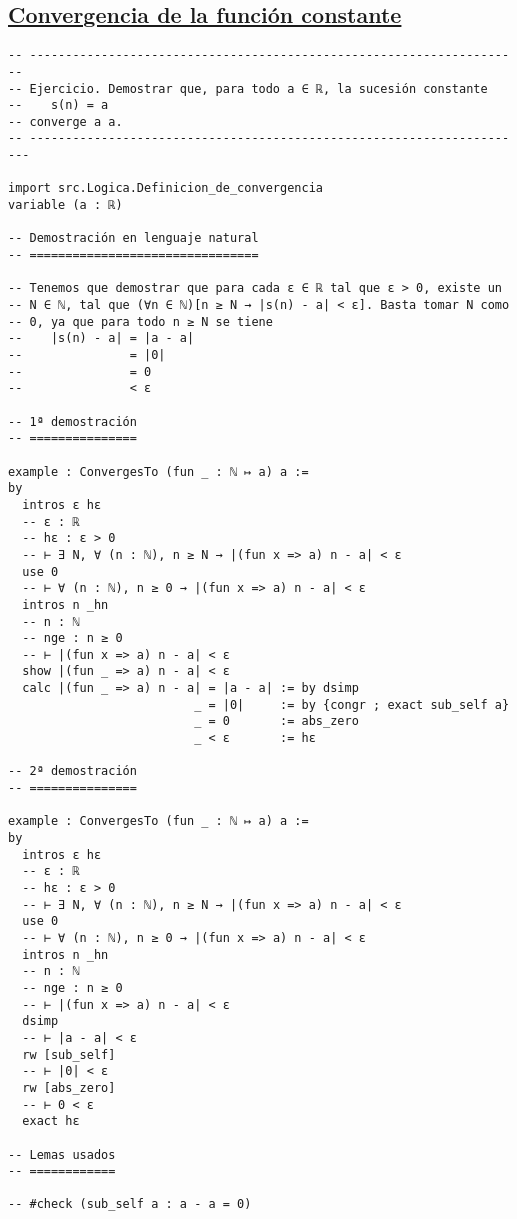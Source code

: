 \subsection{\href{./src/Logica/Convergencia\_de\_la\_funcion\_constante.lean}{Convergencia de la función constante}}
\label{sec:org748f3d4}
\begin{verbatim}
-- ---------------------------------------------------------------------
-- Ejercicio. Demostrar que, para todo a ∈ ℝ, la sucesión constante
--    s(n) = a
-- converge a a.
-- ----------------------------------------------------------------------

import src.Logica.Definicion_de_convergencia
variable (a : ℝ)

-- Demostración en lenguaje natural
-- ================================

-- Tenemos que demostrar que para cada ε ∈ ℝ tal que ε > 0, existe un
-- N ∈ ℕ, tal que (∀n ∈ ℕ)[n ≥ N → |s(n) - a| < ε]. Basta tomar N como
-- 0, ya que para todo n ≥ N se tiene
--    |s(n) - a| = |a - a|
--               = |0|
--               = 0
--               < ε

-- 1ª demostración
-- ===============

example : ConvergesTo (fun _ : ℕ ↦ a) a :=
by
  intros ε hε
  -- ε : ℝ
  -- hε : ε > 0
  -- ⊢ ∃ N, ∀ (n : ℕ), n ≥ N → |(fun x => a) n - a| < ε
  use 0
  -- ⊢ ∀ (n : ℕ), n ≥ 0 → |(fun x => a) n - a| < ε
  intros n _hn
  -- n : ℕ
  -- nge : n ≥ 0
  -- ⊢ |(fun x => a) n - a| < ε
  show |(fun _ => a) n - a| < ε
  calc |(fun _ => a) n - a| = |a - a| := by dsimp
                          _ = |0|     := by {congr ; exact sub_self a}
                          _ = 0       := abs_zero
                          _ < ε       := hε

-- 2ª demostración
-- ===============

example : ConvergesTo (fun _ : ℕ ↦ a) a :=
by
  intros ε hε
  -- ε : ℝ
  -- hε : ε > 0
  -- ⊢ ∃ N, ∀ (n : ℕ), n ≥ N → |(fun x => a) n - a| < ε
  use 0
  -- ⊢ ∀ (n : ℕ), n ≥ 0 → |(fun x => a) n - a| < ε
  intros n _hn
  -- n : ℕ
  -- nge : n ≥ 0
  -- ⊢ |(fun x => a) n - a| < ε
  dsimp
  -- ⊢ |a - a| < ε
  rw [sub_self]
  -- ⊢ |0| < ε
  rw [abs_zero]
  -- ⊢ 0 < ε
  exact hε

-- Lemas usados
-- ============

-- #check (sub_self a : a - a = 0)
\end{verbatim}

